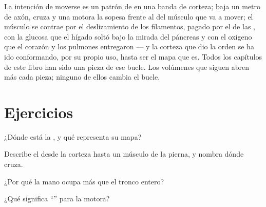 \begin{remark}\label{rem:g12:brain-and-movement:loop}
La intención de moverse es un patrón de  en una
banda de corteza; baja un metro de axón, cruza y una  motora la
sopesa frente al  del músculo que va a mover; el músculo se
contrae por el deslizamiento de los filamentos, pagado por el  de
las , con la glucosa que el hígado soltó bajo la mirada del
páncreas y con el oxígeno que el corazón y los pulmones entregaron ---
y la corteza que dio la orden se ha ido conformando, por su propio uso,
hasta ser el mapa que es. Todos los capítulos de este libro han sido
una pieza de ese bucle. Los volúmenes que siguen abren más cada pieza;
ninguno de ellos cambia el bucle.
\end{remark}

\section{Ejercicios}

\begin{exercise}[$\star$]\label{exo:g12:brain-and-movement:1}
¿Dónde está la , y qué representa su mapa?
\end{exercise}

\begin{exercise}[$\star$]\label{exo:g12:brain-and-movement:2}
Describe el  desde la corteza hasta un músculo de la
pierna, y nombra dónde cruza.
\end{exercise}

\begin{exercise}[$\star$]\label{exo:g12:brain-and-movement:3}
¿Por qué la mano ocupa más  que el tronco entero?
\end{exercise}

\begin{exercise}[$\star$]\label{exo:g12:brain-and-movement:4}
¿Qué significa ``'' para la  motora?
\end{exercise}

